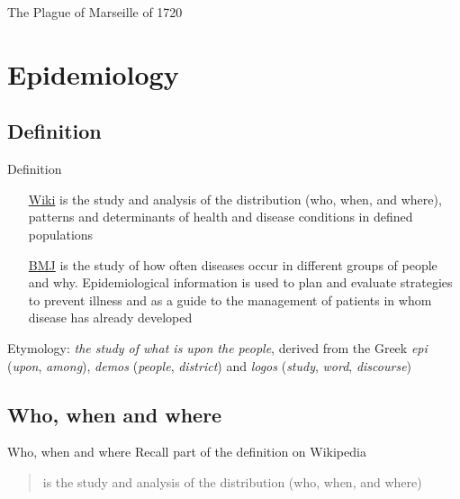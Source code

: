 \documentclass[aspectratio=43]{beamer}
\begin{document}
\begin{frame}{The Plague of Marseille of 1720}
\end{frame}
\section{Epidemiology}

\subsection{Definition}
\begin{frame}{Definition}

\begin{itemize}
    \item[\href{https://en.wikipedia.org/wiki/Epidemiology}{Wiki}] 
     is the study and analysis of the distribution (who, when, and where), patterns and determinants of health and disease conditions in defined populations
    \item[\href{https://www.bmj.com/about-bmj/resources-readers/publications/epidemiology-uninitiated/1-what-epidemiology}{BMJ}]
     is the study of how often diseases occur in different groups of people and why. Epidemiological information is used to plan and evaluate strategies to prevent illness and as a guide to the management of patients in whom disease has already developed 
\end{itemize}
\vfill
Etymology: \emph{the study of what is upon the people}, derived from the Greek \emph{epi} (\emph{upon}, \emph{among}), \emph{demos} (\emph{people}, \emph{district}) and \emph{logos} (\emph{study}, \emph{word}, \emph{discourse})
\end{frame}

\subsection{Who, when and where}


\begin{frame}{Who, when and where}
Recall part of the definition on Wikipedia
\begin{quote}
 is the study and analysis of the distribution (who, when, and where)  
\end{quote}
\end{frame}
\end{document}
